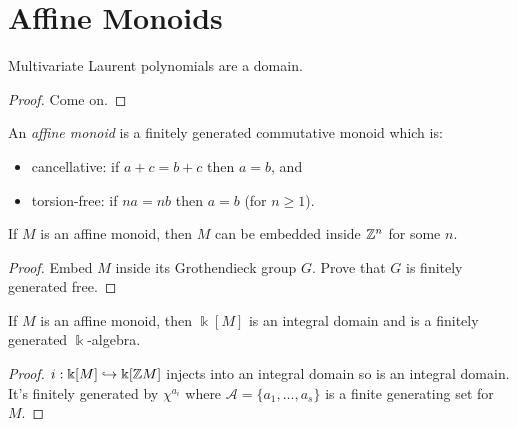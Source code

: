 \section{Affine Monoids}


\begin{lemma}
  \label{0-mv-laurent-poly-domain}
  \uses{}
  \leanok

  Multivariate Laurent polynomials are a domain.
\end{lemma}
\begin{proof}
  \uses{}

  Come on.
\end{proof}


\begin{definition}
  \label{0-aff-mon}
  \leanok

  An \emph{affine monoid} is a finitely generated commutative monoid which is:
  \begin{itemize}
    \item cancellative: if $a + c = b + c$ then $a = b$, and
    \item torsion-free: if $n a = n b$ then $a = b$ (for $n \geq 1$).
  \end{itemize}
\end{definition}


\begin{proposition}
  \label{0-embed-aff-mon}
  \leanok

  If $M$ is an affine monoid, then $M$ can be embedded inside ${\mathbb Z}^n$ for some $n$.
\end{proposition}
\begin{proof}
  \uses{}
  \leanok

  Embed $M$ inside its Grothendieck group $G$. Prove that $G$ is finitely generated free.
\end{proof}


\begin{proposition}
  \label{0-aff-mon-alg-domain}
  \leanok

  If $M$ is an affine monoid, then $\Bbbk[M]$ is an integral domain and is a finitely generated $\Bbbk$-algebra.
\end{proposition}
\begin{proof}
  \leanok

  $i : \Bbbk[M] \hookrightarrow \Bbbk[{\mathbb Z} M]$ injects into an integral domain so is an integral domain. It's finitely generated by $\chi^{a_i}$ where $\mathcal A = \{a_1, \dotsc, a_s\}$ is a finite generating set for $M$.
\end{proof}


